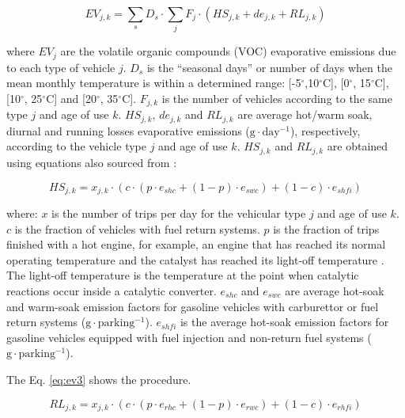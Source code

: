 \documentclass[12pt,graybox,envcountchap,sectrefs]{krantz}
\theoremstyle{definition}
\theoremstyle{definition}
\theoremstyle{definition}
\theoremstyle{remark}
\begin{document}
\begin{equation}
EV_{j,k} =\sum_{s}D_{s} \cdot \sum_{j}F_{j} \cdot (HS_{j,k}+de_{j,k}+RL_{j,k}) 
\label{eq:ev1}
\end{equation}

where \(EV_{j}\) are the volatile organic compounds (VOC) evaporative
emissions due to each type of vehicle \(j\). \(D_s\) is the ``seasonal
days'' or number of days when the mean monthly temperature is within a
determined range: {[}-5\(^{\circ}\),10\(^{\circ}\)C{]},
{[}0\(^{\circ}\), 15\(^{\circ}\)C{]}, {[}10\(^{\circ}\),
25\(^{\circ}\)C{]} and {[}20\(^{\circ}\), 35\(^{\circ}\)C{]}.
\(F_{j,k}\) is the number of vehicles according to the same type \(j\)
and age of use \(k\). \(HS_{j,k}\), \(de_{j,k}\) and \(RL_{j,k}\) are
average hot/warm soak, diurnal and running losses evaporative emissions
(\(\mathrm{g \cdot day^{-1}}\)), respectively, according to the vehicle
type \(j\) and age of use \(k\). \(HS_{j,k}\) and \(RL_{j,k}\) are
obtained using equations also sourced from
\citep{MelliosNtziachristos2016}:

\begin{equation}
HS_{j,k} = x_{j,k} \cdot (c \cdot (p \cdot e_{shc}+(1-p) \cdot e_{swc})+(1-c) \cdot e_{shfi} )
\label{eq:ev2}
\end{equation}

where: \(x\) is the number of trips per day for the vehicular type \(j\)
and age of use \(k\). \(c\) is the fraction of vehicles with fuel return
systems. \(p\) is the fraction of trips finished with a hot engine, for
example, an engine that has reached its normal operating temperature and
the catalyst has reached its light-off temperature
\citep{NtziachristosSamaras2016}. The light-off temperature is the
temperature at the point when catalytic reactions occur inside a
catalytic converter. \(e_{shc}\) and \(e_{swc}\) are average hot-soak
and warm-soak emission factors for gasoline vehicles with carburettor or
fuel return systems (\(\mathrm{g \cdot parking^{-1}}\)). \(e_{shfi}\) is
the average hot-soak emission factors for gasoline vehicles equipped
with fuel injection and non-return fuel systems
(\(\mathrm{g \cdot parking^{-1}}\)).

The Eq. \eqref{eq:ev3} shows the procedure.

\begin{equation}
RL_{j,k} = x_{j,k} \cdot (c \cdot (p \cdot e_{rhc}+(1-p) \cdot e_{rwc})+(1-c) \cdot e_{rhfi} )
\label{eq:ev3}
\end{equation}
\end{document}
